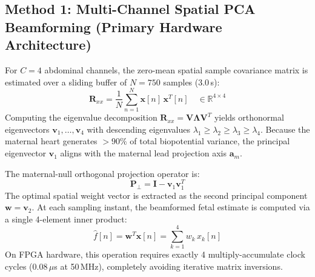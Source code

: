 \documentclass[10pt,twocolumn,letterpaper]{article}
\newcommand{\newcontent}[1]{\textcolor{midtermblue}{#1}}
\begin{document}
\newcontent{\subsection{Method 1: Multi-Channel Spatial PCA Beamforming (Primary Hardware Architecture)}
For $C=4$ abdominal channels, the zero-mean spatial sample covariance matrix is estimated over a sliding buffer of $N=750$ samples (3.0\,s):
\begin{equation}
    \mathbf{R}_{xx} = \frac{1}{N} \sum_{n=1}^N \mathbf{x}[n]\,\mathbf{x}^T[n] \quad \in \mathbb{R}^{4 \times 4}
\end{equation}
Computing the eigenvalue decomposition $\mathbf{R}_{xx} = \mathbf{V} \mathbf{\Lambda} \mathbf{V}^T$ yields orthonormal eigenvectors $\mathbf{v}_1, \dots, \mathbf{v}_4$ with descending eigenvalues $\lambda_1 \ge \lambda_2 \ge \lambda_3 \ge \lambda_4$. Because the maternal heart generates $>90\%$ of total biopotential variance, the principal eigenvector $\mathbf{v}_1$ aligns with the maternal lead projection axis $\mathbf{a}_m$.

The maternal-null orthogonal projection operator is:
\begin{equation}
    \mathbf{P}_{\perp} = \mathbf{I} - \mathbf{v}_1 \mathbf{v}_1^T
\end{equation}
The optimal spatial weight vector is extracted as the second principal component $\mathbf{w} = \mathbf{v}_2$. At each sampling instant, the beamformed fetal estimate is computed via a single 4-element inner product:
\begin{equation}
    \hat{f}[n] = \mathbf{w}^T \mathbf{x}[n] = \sum_{k=1}^4 w_k\,x_k[n]
\end{equation}
On FPGA hardware, this operation requires exactly 4 multiply-accumulate clock cycles (0.08\,$\mu$s at 50\,MHz), completely avoiding iterative matrix inversions.}
\end{document}
